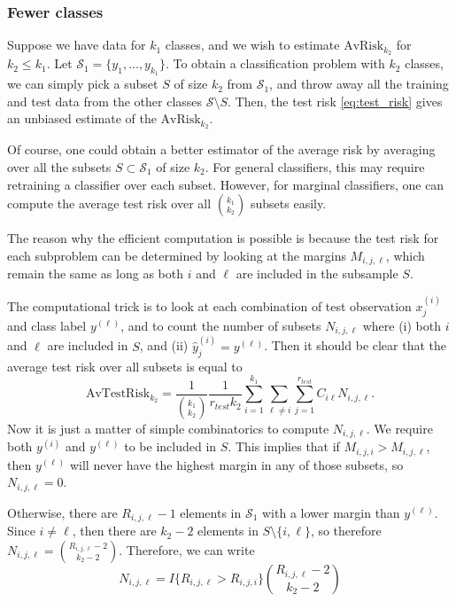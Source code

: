\documentclass[12pt]{article}
\begin{document}
\subsubsection{Fewer classes}

Suppose we have data for $k_1$ classes, and we wish to estimate
$\text{AvRisk}_{k_2}$ for $k_2 \leq k_1$.  Let $\mathcal{S}_1
= \{y_1,\hdots,y_{k_1}\}$.  To obtain a classification problem with
$k_2$ classes, we can simply pick a subset $S$ of size $k_2$ from
$\mathcal{S}_1$, and throw away all the training and test data from the
other classes $\mathcal{S}\setminus S$.  Then, the test
risk \eqref{eq:test_risk} gives an unbiased estimate of the
$\text{AvRisk}_{k_2}$.

Of course, one could obtain a better estimator of the average risk by
averaging over all the subsets $S \subset \mathcal{S}_1$ of size
$k_2$.  For general classifiers, this may require retraining a
classifier over each subset.  However, for marginal classifiers, one
can compute the average test risk over all ${k_1}\choose{k_2}$ subsets
easily.

The reason why the efficient computation is possible is because the
test risk for each subproblem can be determined by looking at the
margins $M_{i, j, \ell}$, which remain the same as long as both $i$
and $\ell$ are included in the subsample $S$.

The computational trick is to look at each combination of test
observation $x_j^{(i)}$ and class label $y^{(\ell)}$, and to count the
number of subsets $N_{i, j, \ell}$ where (i) both $i$ and $\ell$ are
included in $S$, and (ii) $\hat{y}_j^{(i)} = y^{(\ell)}$.  Then it
should be clear that the average test risk over all subsets is equal
to
\begin{equation}\label{eq:avtestrisk}
\text{AvTestRisk}_{k_2} = \frac{1}{{{k_1}\choose{k_2}}}\frac{1}{r_{test}k_2} \sum_{i=1}^{k_1} \sum_{\ell\neq i} \sum_{j=1}^{r_{test}} C_{i\ell}N_{i, j, \ell}.
\end{equation}
Now it is just a matter of simple combinatorics to compute
$N_{i,j,\ell}$.  We require both $y^{(i)}$ and $y^{(\ell)}$ to be
included in $S$.  This implies that if $M_{i,j,i} > M_{i,j,\ell}$,
then $y^{(\ell)}$ will never have the highest margin in any of those
subsets, so $N_{i,j,\ell} = 0$.

Otherwise, there are $R_{i,j,\ell} - 1$ elements in $\mathcal{S}_1$
with a lower margin than $y^{(\ell)}$.  Since $i \neq \ell$, then there
are $k_2-2$ elements in $S \setminus \{i, \ell\}$, so therefore $N_{i,
j, \ell} = {{R_{i,j,\ell} - 2}\choose{k_2 - 2}}$.  Therefore, we can write
\begin{equation}\label{eq:avtestrisk_nil}
N_{i,j,\ell} = I\{R_{i,j,\ell} > R_{i,j,i}\}{{R_{i,j,\ell} -2}\choose{k_2 - 2}}
\end{equation}
\end{document}
